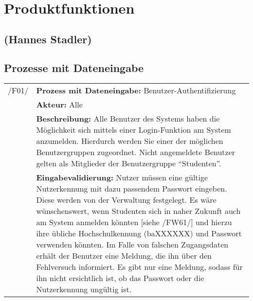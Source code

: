 \section{Produktfunktionen}
\label{sec:Produktfunktionen}

\subsection*{(Hannes Stadler)}

\subsection{Prozesse mit Dateneingabe}

\begin{tabular}{p{1.5cm}p{14.5cm}}


	 /F01/	& \textbf{Prozess mit Dateneingabe:} Benutzer-Authentifizierung \\
				& \textbf{Akteur:} Alle \\
				& \textbf{Beschreibung:} Alle Benutzer des Systems haben die Möglichkeit sich mittels einer Login-Funktion am System anzumelden. Hierdurch werden Sie einer der möglichen Benutzergruppen zugeordnet. Nicht angemeldete Benutzer gelten als Mitglieder der Benutzergruppe "`Studenten"'. \\
				& \textbf{Eingabevalidierung:} Nutzer müssen eine gültige Nutzerkennung mit dazu passendem Passwort eingeben. Diese werden von der Verwaltung festgelegt. Es wäre wünschenswert, wenn Studenten sich in naher Zukunft auch am System anmelden könnten [siehe /FW61/] und hierzu ihre übliche Hochschulkennung (baXXXXXX) und Passwort verwenden könnten. Im Falle von falschen Zugangsdaten erhält der Benutzer eine Meldung, die ihn über den Fehlversuch informiert. Es gibt nur eine Meldung, sodass für ihn nicht ersichtlich ist, ob das Passwort oder die Nutzerkennung ungültig ist.\\[0.25cm]

\end{tabular}


